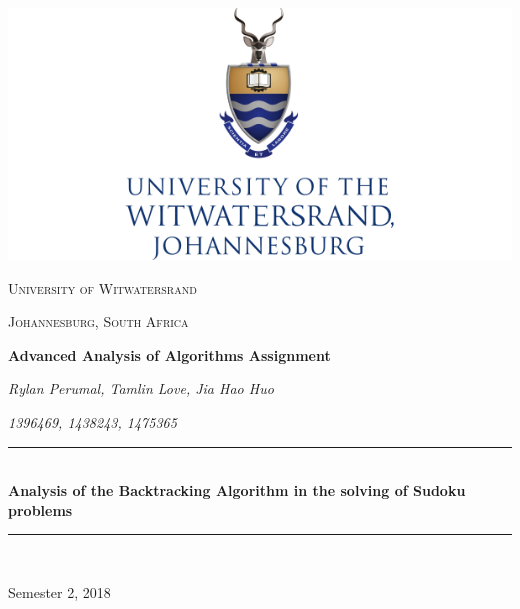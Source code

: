 \documentclass[a4paper]{article}
\author{Rylan Perumal, Tamlin Love, Jia Hao Huo}
\date{\today}
\begin{document}
\begin{titlepage}
	\centering
	
\includegraphics[scale=0.6]{index.png}
	\vspace{0.5cm}
	
\newcommand{\HRule}{\rule{\linewidth}{0.5mm}} 

{\scshape\Large University of Witwatersrand\par}
{\scshape\Large Johannesburg, South Africa\par}
	\vspace{1cm}
	{\huge\bfseries Advanced Analysis of Algorithms Assignment \par}
	\vspace{1cm}
	{\Large\itshape Rylan Perumal, Tamlin Love, Jia Hao Huo\par}
	\vspace{0.5cm}
	{\Large\itshape 1396469, 1438243, 1475365\par}
	\vfill
	
\HRule \\[0.4cm]
{ \huge \bfseries Analysis of the Backtracking Algorithm in the solving of Sudoku problems}\\[0.4cm] 
\HRule \\[1.5cm]

	{\large Semester 2, 2018\par}

\end{titlepage}
\end{document}
